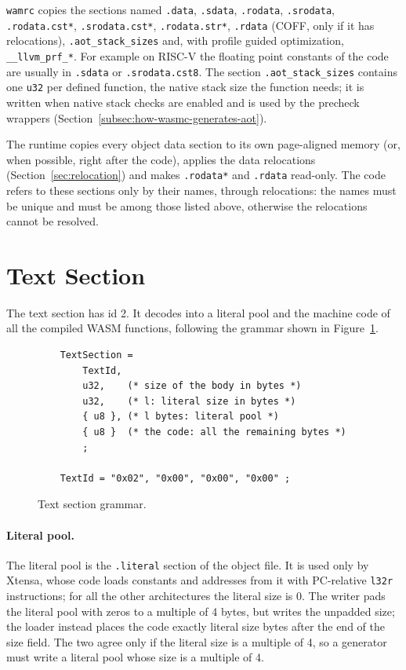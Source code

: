 \documentclass{article}
\begin{document}
\texttt{wamrc} copies the sections named \verb|.data|, \verb|.sdata|, \verb|.rodata|, \verb|.srodata|, \verb|.rodata.cst*|, \verb|.srodata.cst*|, \verb|.rodata.str*|, \verb|.rdata| (COFF, only if it has relocations), \verb|.aot_stack_sizes| and, with profile guided optimization, \verb|__llvm_prf_*|.
For example on RISC-V the floating point constants of the code are usually in \verb|.sdata| or \verb|.srodata.cst8|.
The section \verb|.aot_stack_sizes| contains one \verb|u32| per defined function, the native stack size the function needs; it is written when native stack checks are enabled and is used by the precheck wrappers (Section~\ref{subsec:how-wasmc-generates-aot}).

The runtime copies every object data section to its own page-aligned memory (or, when possible, right after the code), applies the data relocations (Section~\ref{sec:relocation}) and makes \verb|.rodata*| and \verb|.rdata| read-only.
The code refers to these sections only by their names, through relocations: the names must be unique and must be among those listed above, otherwise the relocations cannot be resolved.

\section{Text Section}
\label{sec:text}
The text section has id 2.
It decodes into a literal pool and the machine code of all the compiled WASM functions, following the grammar shown in Figure~\ref{fig:text-section-grammar}.

\begin{figure}[H]
\begin{verbatim}
    TextSection =
        TextId,
        u32,    (* size of the body in bytes *)
        u32,    (* l: literal size in bytes *)
        { u8 }, (* l bytes: literal pool *)
        { u8 }  (* the code: all the remaining bytes *)
        ;

    TextId = "0x02", "0x00", "0x00", "0x00" ;
\end{verbatim}
\caption{Text section grammar.}
\label{fig:text-section-grammar}
\end{figure}

\paragraph{Literal pool.}
The literal pool is the \verb|.literal| section of the object file. It is used only by Xtensa, whose code loads constants and addresses from it with PC-relative \verb|l32r| instructions; for all the other architectures the literal size is 0.
The writer pads the literal pool with zeros to a multiple of 4 bytes, but writes the unpadded size; the loader instead places the code exactly literal size bytes after the end of the size field.
The two agree only if the literal size is a multiple of 4, so a generator must write a literal pool whose size is a multiple of 4.
\end{document}
